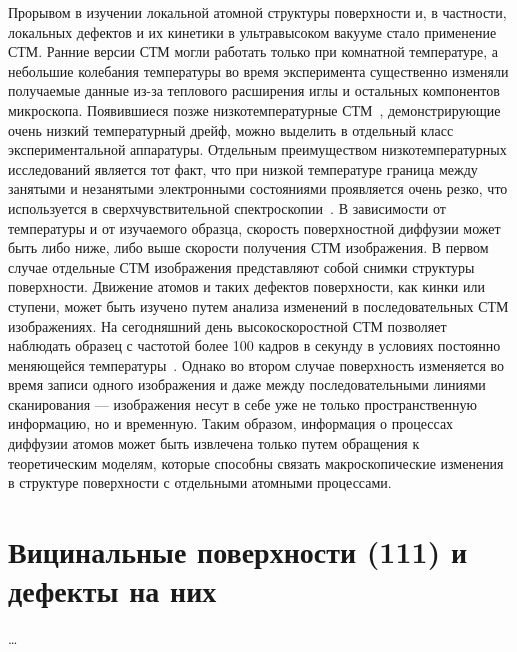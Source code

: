 Прорывом в изучении локальной атомной структуры поверхности и, в частности, локальных дефектов и их кинетики в ультравысоком вакууме стало применение СТМ\cite{Binnig1982,PhysRevLett.49.57,PhysRevLett.50.120}.
Ранние версии СТМ могли работать только при комнатной температуре, а небольшие колебания температуры во время эксперимента существенно изменяли получаемые данные из-за теплового расширения иглы и остальных компонентов микроскопа.
Появившиеся позже низкотемпературные СТМ~\cite{denHaan2014}, демонстрирующие очень низкий температурный дрейф, можно выделить в отдельный класс экспериментальной аппаратуры. Отдельным преимуществом низкотемпературных исследований является тот факт, что при низкой температуре граница между занятыми и незанятыми электронными состояниями проявляется очень резко, что используется в сверхчувствительной спектроскопии~\cite{Song2010}.
В зависимости от температуры и от изучаемого образца, скорость поверхностной диффузии может быть либо ниже, либо выше скорости получения СТМ изображения. В первом случае отдельные СТМ изображения представляют собой снимки структуры поверхности. Движение атомов и таких дефектов поверхности, как кинки или ступени, может быть изучено путем анализа изменений в последовательных СТМ изображениях. На сегодняшний день высокоскоростной СТМ позволяет наблюдать образец с частотой более 100 кадров в секунду в условиях постоянно меняющейся температуры~\cite{Frenken2017}. Однако во втором случае поверхность изменяется во время записи одного изображения и даже между последовательными линиями сканирования --- изображения несут в себе уже не только пространственную информацию, но и временную. Таким образом, информация о процессах диффузии атомов может быть извлечена только путем обращения к теоретическим моделям, которые способны связать макроскопические изменения в структуре поверхности с отдельными атомными процессами.


\section{Вицинальные поверхности (111) и дефекты на них}

\dots

